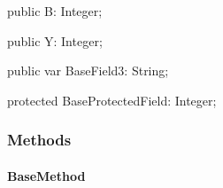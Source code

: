 \documentclass{report}
\newif\ifpdf
\begin{document}
\begin{list}{}
\par  \label{ok_inherited_members.TBase-B}
\item[\textbf{B}\hfill]
\ifpdf
\begin{flushleft}
\fi
\begin{ttfamily}
public B: Integer;\end{ttfamily}

\ifpdf
\end{flushleft}
\fi


\par  \label{ok_inherited_members.TBase-Y}
\item[\textbf{Y}\hfill]
\ifpdf
\begin{flushleft}
\fi
\begin{ttfamily}
public Y: Integer;\end{ttfamily}

\ifpdf
\end{flushleft}
\fi


\par  \label{ok_inherited_members.TBase-BaseField3}
\item[\textbf{BaseField3}\hfill]
\ifpdf
\begin{flushleft}
\fi
\begin{ttfamily}
public var BaseField3: String;\end{ttfamily}

\ifpdf
\end{flushleft}
\fi


\par  \label{ok_inherited_members.TBase-BaseProtectedField}
\item[\textbf{BaseProtectedField}\hfill]
\ifpdf
\begin{flushleft}
\fi
\begin{ttfamily}
protected BaseProtectedField: Integer;\end{ttfamily}

\ifpdf
\end{flushleft}
\fi


\par  \end{list}
\subsubsection*{\large{\textbf{Methods}}\normalsize\hspace{1ex}\hfill}
\paragraph*{BaseMethod}\hspace*{\fill}
\end{document}
